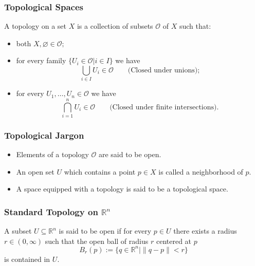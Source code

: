 \documentclass{beamer}
\begin{document}
\begin{frame}

\frametitle{Topological Spaces}

\begin{definition}
A topology on a set $X$ is a collection of subsets $\mathcal{O}$ of $X$ such that:

\begin{itemize}

\item both $X,\varnothing\in\mathcal{O};$

\item for every family $\{U_i\in\mathcal{O}|i\in I\}$ we have 
\begin{equation}
\bigcup_{i\in I}U_i\in\mathcal{O}\qquad\text{(Closed under unions);}
\end{equation}

\item for every $U_1,\dots,U_n\in\mathcal{O}$ we have
\begin{equation}
\bigcap_{i=1}^nU_i\in\mathcal{O}\qquad\text{(Closed under finite intersections).}
\end{equation}

\end{itemize}

\end{definition}

\end{frame}

\begin{frame}

\frametitle{Topological Jargon}

\begin{itemize}

\item Elements of a topology $\mathcal{O}$ are said to be open.

\item An open set $U$ which contains a point $p\in X$ is called a neighborhood of $p$.

\item A space equipped with a topology is said to be a topological space.

\end{itemize}

\end{frame}

\begin{frame}

\frametitle{Standard Topology on $\mathbb{R}^n$}

A subset $U\subseteq\mathbb{R}^n$ is said to be open if for every $p\in U$ there exists a radius $r\in(0,\infty)$ such that the open ball of radius $r$ centered at $p$
\begin{equation}
B_r(p):=\{q\in\mathbb{R}^n|\|q-p\|<r\}
\end{equation}
is contained in $U$.

\end{frame}
\end{document}
